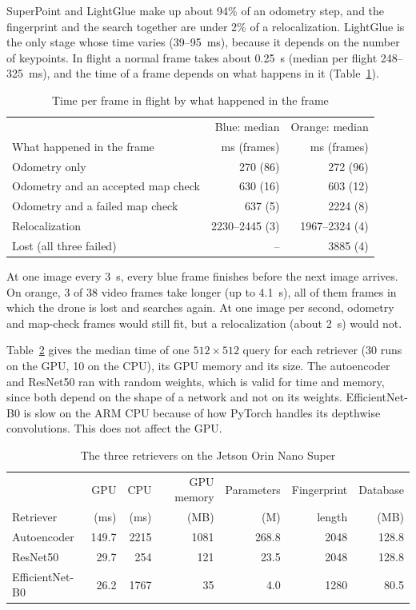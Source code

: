 \documentclass[english, Lau, oneside]{sapthesis}%
\begin{document}
SuperPoint and LightGlue make up about 94\% of an odometry step, and the fingerprint and the search together are under 2\% of a relocalization. LightGlue is the only stage whose time varies (39--95~ms), because it depends on the number of keypoints. In flight a normal frame takes about 0.25~s (median per flight 248--325~ms), and the time of a frame depends on what happens in it (Table~\ref{tab:jetson-frames}).

\begin{table}[!htbp]
  \centering
  \caption{Time per frame in flight by what happened in the frame}
  \label{tab:jetson-frames}
  \small
  \begin{tabular}{lrr}
    \toprule
     & Blue: median & Orange: median \\
    What happened in the frame & ms (frames) & ms (frames) \\
    \midrule
    Odometry only & 270 (86) & 272 (96) \\
    Odometry and an accepted map check & 630 (16) & 603 (12) \\
    Odometry and a failed map check & 637 (5) & 2224 (8) \\
    Relocalization & 2230--2445 (3) & 1967--2324 (4) \\
    Lost (all three failed) & -- & 3885 (4) \\
    \bottomrule
  \end{tabular}
\end{table}

At one image every 3~s, every blue frame finishes before the next image arrives. On orange, 3 of 38 video frames take longer (up to 4.1~s), all of them frames in which the drone is lost and searches again. At one image per second, odometry and map-check frames would still fit, but a relocalization (about 2~s) would not.

Table~\ref{tab:jetson-retrievers} gives the median time of one $512 \times 512$ query for each retriever (30 runs on the GPU, 10 on the CPU), its GPU memory and its size. The autoencoder and ResNet50 ran with random weights, which is valid for time and memory, since both depend on the shape of a network and not on its weights. EfficientNet-B0 is slow on the ARM CPU because of how PyTorch handles its depthwise convolutions. This does not affect the GPU.

\begin{table}[!htbp]
  \centering
  \caption{The three retrievers on the Jetson Orin Nano Super}
  \label{tab:jetson-retrievers}
  \footnotesize\setlength{\tabcolsep}{4pt}
  \begin{tabular}{lrrrrrr}
    \toprule
     & GPU & CPU & GPU memory & Parameters & Fingerprint & Database \\
    Retriever & (ms) & (ms) & (MB) & (M) & length & (MB) \\
    \midrule
    Autoencoder & 149.7 & 2215 & 1081 & 268.8 & 2048 & 128.8 \\
    ResNet50 & 29.7 & 254 & 121 & 23.5 & 2048 & 128.8 \\
    EfficientNet-B0 & 26.2 & 1767 & 35 & 4.0 & 1280 & 80.5 \\
    \bottomrule
  \end{tabular}
\end{table}
\end{document}
